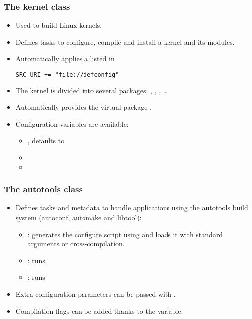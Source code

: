 \begin{frame}[fragile]
  \frametitle{The kernel class}
  \begin{itemize}
    \item Used to build Linux kernels.
    \item Defines tasks to configure, compile and install a kernel and
          its modules.
    \item Automatically applies a  listed in 
      \begin{block}{}
        \begin{verbatim}
SRC_URI += "file://defconfig"
        \end{verbatim}
      \end{block}
    \item The kernel is divided into several packages: ,
          , ,
          \dots
    \item Automatically provides the virtual package
          .
    \item Configuration variables are available:
    \begin{itemize}
      \item {}, defaults to 
      \item {}
      \item {}
    \end{itemize}
  \end{itemize}
\end{frame}

\begin{frame}
  \frametitle{The autotools class}
  \begin{itemize}
    \item Defines tasks and metadata to handle applications using the
          autotools build system (autoconf, automake and libtool):
    \begin{itemize}
      \item {}: generates the configure script using
             and loads it with standard arguments or
            cross-compilation.
      \item {}: runs 
      \item {}: runs 
    \end{itemize}
    \item Extra configuration parameters can be passed with
          .
    \item Compilation flags can be added thanks to the
           variable.
  \end{itemize}
\end{frame}

